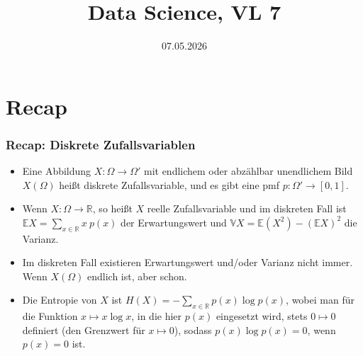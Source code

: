 

\title{Data Science, VL 7} %
\date{07.05.2026}



\begin{frame}
  \titlepage
\end{frame}


\section{Recap}

\begin{frame}
  \frametitle{Recap: Diskrete Zufallsvariablen}
  \begin{itemize}[<+->]
  \item Eine Abbildung $X \colon \Omega \to \Omega'$ mit endlichem oder abzählbar unendlichem Bild $X(\Omega)$ heißt \alert{diskrete Zufallsvariable}, und es gibt eine pmf $p \colon \Omega' \to [0,1]$.\smallskip
  \item Wenn $X \colon \Omega \to \mathbb{R}$, so heißt $X$ \alert{reelle Zufallsvariable} und im diskreten Fall ist $\mathbb{E}X = \sum_{x \in \mathbb{R}} x\ p(x)$ der Erwartungswert und $\mathbb{V}X = \mathbb{E}(X^2) - (\mathbb{E}X)^2$ die Varianz.\smallskip
  \item Im diskreten Fall existieren Erwartungswert und/oder Varianz nicht immer. Wenn $X(\Omega)$ endlich ist, aber schon.\smallskip
  \item Die Entropie von $X$ ist $H(X) = -\sum_{x \in \mathbb{R}} p(x)\log p(x)$, wobei man für die Funktion $x \mapsto x\log x$, in die hier $p(x)$ eingesetzt wird, stets $0 \mapsto 0$ definiert (den Grenzwert für $x\mapsto 0$), sodass $p(x)\log p(x) = 0$, wenn $p(x)=0$ ist.
  \end{itemize}
\end{frame}


